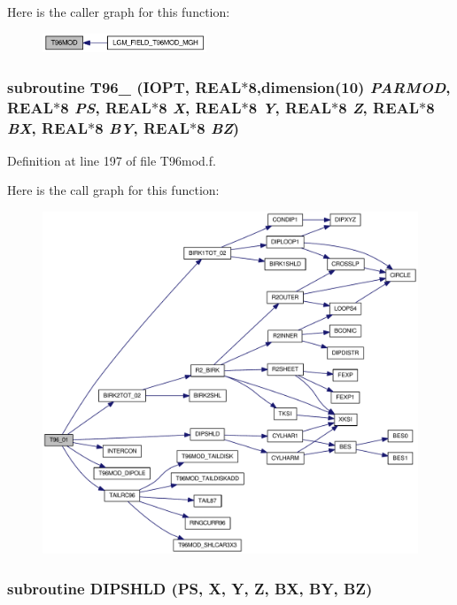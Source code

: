 Here is the caller graph for this function:\nopagebreak
\begin{figure}[H]
\begin{center}
\leavevmode
\includegraphics[width=139pt]{_t96mod_8f_d1b3c77658e29c0a582e4458288a48a7_icgraph}
\end{center}
\end{figure}
\hypertarget{_t96mod_8f_7194bba01ce7c686c27501da1f6e23a8}{
\subsubsection[{T96\_\-01}]{\setlength{\rightskip}{0pt plus 5cm}subroutine T96\_ (IOPT, \/  REAL$\ast$8,dimension(10) {\em PARMOD}, \/  REAL$\ast$8 {\em PS}, \/  REAL$\ast$8 {\em X}, \/  REAL$\ast$8 {\em Y}, \/  REAL$\ast$8 {\em Z}, \/  REAL$\ast$8 {\em BX}, \/  REAL$\ast$8 {\em BY}, \/  REAL$\ast$8 {\em BZ})}}
\label{_t96mod_8f_7194bba01ce7c686c27501da1f6e23a8}




Definition at line 197 of file T96mod.f.

Here is the call graph for this function:\nopagebreak
\begin{figure}[H]
\begin{center}
\leavevmode
\includegraphics[width=339pt]{_t96mod_8f_7194bba01ce7c686c27501da1f6e23a8_cgraph}
\end{center}
\end{figure}
\hypertarget{_t96mod_8f_22b5155440601bb1258e41b0407b707f}{
\subsubsection[{DIPSHLD}]{\setlength{\rightskip}{0pt plus 5cm}subroutine DIPSHLD (PS, \/  X, \/  Y, \/  Z, \/  BX, \/  BY, \/  BZ)}}
\label{_t96mod_8f_22b5155440601bb1258e41b0407b707f}




